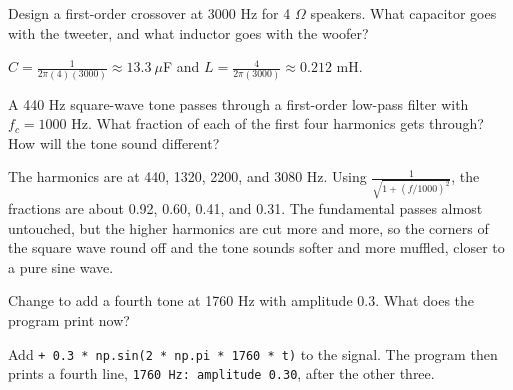 \begin{Exercise}[title={Design a Crossover}, label=fs_xover]
Design a first-order crossover at 3000 Hz for 4 $\Omega$ speakers. What capacitor
goes with the tweeter, and what inductor goes with the woofer?
\end{Exercise}
\begin{Answer}[ref=fs_xover]
$C = \frac{1}{2\pi(4)(3000)} \approx 13.3\ \mu$F and $L = \frac{4}{2\pi(3000)} \approx 0.212$ mH.
\end{Answer}

\begin{Exercise}[title={Filtering a Square Wave}, label=fs_filter]
A 440 Hz square-wave tone passes through a first-order low-pass filter with
$f_c = 1000$ Hz. What fraction of each of the first four harmonics gets through? How
will the tone sound different?
\end{Exercise}
\begin{Answer}[ref=fs_filter]
The harmonics are at 440, 1320, 2200, and 3080 Hz. Using
$\frac{1}{\sqrt{1 + (f/1000)^2}}$, the fractions are about 0.92, 0.60, 0.41, and 0.31.
The fundamental passes almost untouched, but the higher harmonics are cut more and
more, so the corners of the square wave round off and the tone sounds softer and
more muffled, closer to a pure sine wave.
\end{Answer}

\begin{Exercise}[title={Add a Tone}, label=fs_python]
Change  to add a fourth tone at 1760 Hz with amplitude 0.3.
What does the program print now?
\end{Exercise}
\begin{Answer}[ref=fs_python]
Add \texttt{+ 0.3 * np.sin(2 * np.pi * 1760 * t)} to the signal. The program
then prints a fourth line, \texttt{1760 Hz: amplitude 0.30}, after the other three.
\end{Answer}

